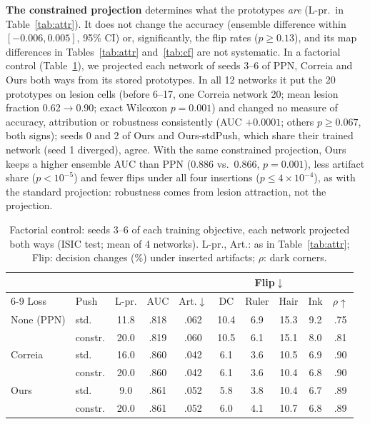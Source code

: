 \documentclass[conference]{IEEEtran}
\begin{document}
\textbf{The constrained projection} determines what the prototypes \emph{are} (L-pr.\ in Table~\ref{tab:attr}). It does not change the accuracy (ensemble difference within $[-0.006,0.005]$, 95\% CI) or, significantly, the flip rates ($p\geq0.13$), and its map differences in Tables~\ref{tab:attr} and~\ref{tab:cf} are not systematic. In a factorial control (Table~\ref{tab:fact}), we projected each network of seeds 3--6 of PPN, Correia and Ours both ways from its stored prototypes. In all 12 networks it put the 20 prototypes on lesion cells (before 6--17, one Correia network 20; mean lesion fraction 0.62$\rightarrow$0.90; exact Wilcoxon $p=0.001$) and changed no measure of accuracy, attribution or robustness consistently (AUC $+0.0001$; others $p\geq0.067$, both signs); seeds 0 and 2 of Ours and Ours-stdPush, which share their trained network (seed 1 diverged), agree. With the same constrained projection, Ours keeps a higher ensemble AUC than PPN (0.886 vs.\ 0.866, $p=0.001$), less artifact share ($p<10^{-5}$) and fewer flips under all four insertions ($p\leq4\times10^{-4}$), as with the standard projection: robustness comes from lesion attraction, not the projection.

\begin{table}[t]
\caption{Factorial control: seeds 3--6 of each training objective, each network projected both ways (ISIC test; mean of 4 networks). L-pr., Art.: as in Table~\ref{tab:attr}; Flip: decision changes (\%) under inserted artifacts; $\rho$: dark corners.}
\label{tab:fact}
\centering
\scriptsize
\setlength{\tabcolsep}{2.6pt}
\begin{tabular}{llcccccccc}
\toprule
& & & & & \multicolumn{4}{c}{Flip$\downarrow$} & \\
\cmidrule(lr){6-9}
Loss & Push & L-pr. & AUC & Art.$\downarrow$ & DC & Ruler & Hair & Ink & $\rho\uparrow$ \\
\midrule
None (PPN) & std. & 11.8 & .818 & .062 & 10.4 & 6.9 & 15.3 & 9.2 & .75 \\
& constr. & 20.0 & .819 & .060 & 10.5 & 6.1 & 15.1 & 8.0 & .81 \\
Correia & std. & 16.0 & .860 & .042 & 6.1 & 3.6 & 10.5 & 6.9 & .90 \\
& constr. & 20.0 & .860 & .042 & 6.1 & 3.6 & 10.4 & 6.8 & .90 \\
Ours & std. & 9.0 & .861 & .052 & 5.8 & 3.8 & 10.4 & 6.7 & .89 \\
& constr. & 20.0 & .861 & .052 & 6.0 & 4.1 & 10.7 & 6.8 & .89 \\
\bottomrule
\end{tabular}
\end{table}
\end{document}
